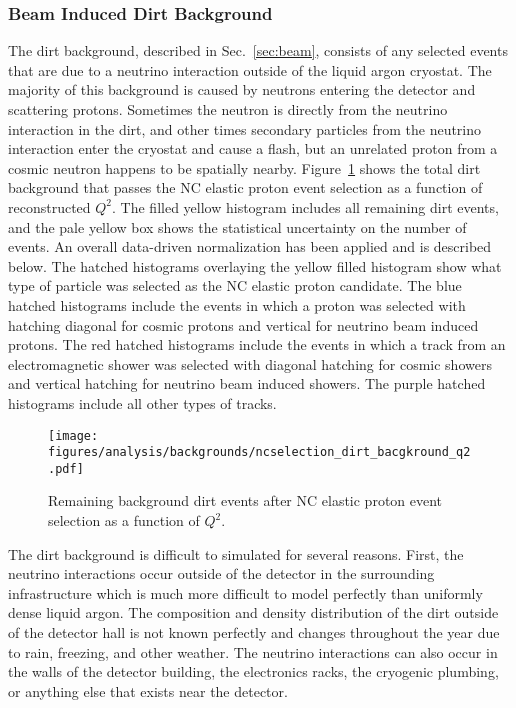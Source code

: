   \subsubsection{Beam Induced Dirt Background}\label{sec:dirt}
    The dirt background, described in Sec.~\ref{sec:beam}, consists of any
    selected events that are due to a neutrino interaction outside of the
    liquid argon cryostat. The majority of this background is caused by
    neutrons entering the detector and scattering protons. Sometimes the
    neutron is directly from the neutrino interaction in the dirt, and other
    times secondary particles from the neutrino interaction enter the cryostat
    and cause a flash, but an unrelated proton from a cosmic neutron happens to
    be spatially nearby. Figure~\ref{fig:selecteddirt} shows the total dirt
    background that passes the NC elastic proton event selection as a function
    of reconstructed $Q^2$. The filled yellow histogram includes all remaining
    dirt events, and the pale yellow box shows the statistical uncertainty on
    the number of events. An overall data-driven normalization has been applied
    and is described below. The hatched histograms overlaying the yellow filled
    histogram show what type of particle was selected as the NC elastic proton
    candidate. The blue hatched histograms include the events in which a proton
    was selected with hatching diagonal for cosmic protons and vertical for
    neutrino beam induced protons. The red hatched histograms include the
    events in which a track from an electromagnetic shower was selected with
    diagonal hatching for cosmic showers and vertical hatching for neutrino
    beam induced showers. The purple hatched histograms include all other types
    of tracks.
    \begin{figure}[ht]
      \centering
      \texttt{[image: figures/analysis/backgrounds/ncselection\_dirt\_bacgkround\_q2.pdf]}
      \caption{Remaining background dirt events after NC elastic proton event
        selection as a function of $Q^2$.}
      \label{fig:selecteddirt}
    \end{figure}

    The dirt background is difficult to simulated for several reasons. First,
    the neutrino interactions occur outside of the detector in the surrounding
    infrastructure which is much more difficult to model perfectly than
    uniformly dense liquid argon. The composition and density distribution of
    the dirt outside of the detector hall is not known perfectly and changes
    throughout the year due to rain, freezing, and other weather. The
    neutrino interactions can also occur in the walls of the detector building,
    the electronics racks, the cryogenic plumbing, or anything else that exists
    near the detector.
    
